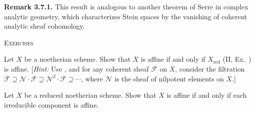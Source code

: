 {\medskip
\noindent\hypertarget{result-III-3.7.1}{}\textbf{Remark 3.7.1.} This result is analogous to another theorem of Serre in complex analytic geometry, which characterizes Stein spaces by the vanishing of coherent analytic sheaf cohomology.

\medskip
\noindent\textsc{Exercises}\par\nobreak\smallskip
{\fontsize{9.2}{10.65}\selectfont\leftskip=20pt
\noindent\hypertarget{ex-III-3.1}{}Let $X$ be a noetherian scheme. Show that $X$ is affine if and only if $X_{\mathrm{red}}$ (II, Ex.~) is affine. [\emph{Hint:} Use , and for any coherent sheaf $\mathcal F$ on $X$, consider the filtration $\mathcal F\supseteq\mathcal N\cdot\mathcal F\supseteq\mathcal N^2\cdot\mathcal F\supseteq\cdots$, where $\mathcal N$ is the sheaf of nilpotent elements on $X$.]

\smallskip
\noindent\hypertarget{ex-III-3.2}{}Let $X$ be a reduced noetherian scheme. Show that $X$ is affine if and only if each irreducible component is affine.\par}
}
